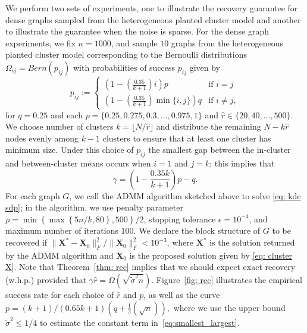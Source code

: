 \documentclass[twoside,11pt]{article}
\newcommand{\bs}{\boldsymbol}
\newcommand{\X}{\bs {X}}
\newcommand{\0}{\bs{0}}
\newcommand{\rbra}[1]{\ensuremath{\left( #1 \right)}} %
\newcommand{\bra}[1]{\ensuremath{\left\{ #1 \right\}}} %
\newcommand{\half}{\frac{1}{2}}
\begin{document}
{%
We perform two sets of experiments, one to illustrate the recovery guarantee for dense graphs sampled from the heterogeneous planted cluster model and another to illustrate the guarantee
when the noise is sparse.
For the dense graph experiments, we fix \(n = 1000\), and sample \(10\) graphs
from the heterogeneous planted cluster model corresponding to the Bernoulli
distributions \(\Omega_{ij} = Bern(p_{ij})\)  with probabilities of success $p_{ij}$ given by
\[
	p_{ij} := \begin{cases} \rbra{ 1 - \rbra{\frac{0.35}{k+1}}i } p &\text{if } i = j \\
								\rbra{ 1 - \rbra{\frac{0.35}{k+1}} \min\{i,j\} } q &\text{if } i \neq j,
							\end{cases}
\]
for $q = 0.25$ and each $p=\{0.25, 0.275, 0.3, \dots, 0.975, 1\}$ and
\(\hat r \in \{20, 40, \dots, 500\}\).
We choose number of clusters $k=\lfloor N/\hat r \rfloor$
and distribute the remaining $N - k\hat r$ nodes
evenly among $k-1$ clusters to ensure that at least one cluster
has minimum size.
Under this choice of $p_{ij}$ the smallest gap between the in-cluster and between-cluster means occurs when $i=1$ and $j = k$; this implies that
\begin{equation}\label{eq: het gam}
	\gamma = \rbra{ 1 - \frac{0.35 k }{k+1}}p - q.
\end{equation}
For each graph \(G\), we call the ADMM algorithm sketched above to solve \eqref{eq: kdc sdp};
in the algorithm, we use penalty parameter \(\rho = \min \bra{ \max \bra{ 5n/k, 80}, 500}/2 \),
stopping tolerance \(\epsilon = 10^{-4}\), and maximum number of iterations \(100\).
We declare the block structure of \(G\) to be recovered if \(\|\X^* - \X_0\|^2_F / \|\X_0\|^2_F < 10^{-3} \),
where \(\X^* \) is the solution returned by the ADMM algorithm and \(\X_0\) is the proposed solution
given by \eqref{eq: cluster X}.
Note that Theorem~\ref{thm: rec} implies that we should expect exact recovery (w.h.p.) provided that
$
	\gamma \hat r = \Omega\rbra{\sqrt{\tilde \sigma^2n}}.
$
Figure~\ref{fig: rec} illustrates the empirical success rate for each choice of \(\hat r\) and \(p\), as well as the curve \( p =(k+1)/(0.65k + 1)(q + \half\rbra{\sqrt{n}}),\) where we use the upper bound $\tilde \sigma^2 \le 1/4$ to estimate the constant term in~\eqref{eq:smallest_largest}.

}
\end{document}
